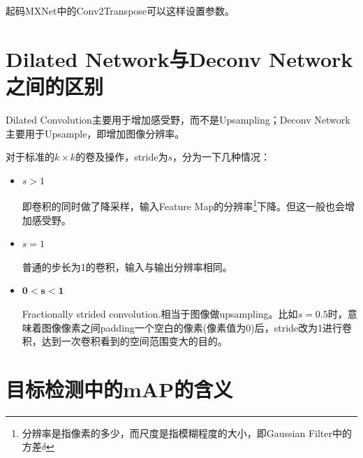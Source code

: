 起码MXNet中的Conv2Transpose可以这样设置参数。




\section{Dilated Network与Deconv Network之间的区别}
Dilated Convolution主要用于增加感受野，而不是Upsampling；Deconv Network主要用于Upsample，即增加图像分辨率。

对于标准的$k \times k$的卷及操作，stride为$s$，分为一下几种情况：
\begin{itemize}
\item $s > 1$

即卷积的同时做了降采样，输入Feature Map的分辨率\footnote{分辨率是指像素的多少，而尺度是指模糊程度的大小，即Gaussian Filter中的方差$\delta$}下降。但这一般也会增加感受野。

\item $s = 1$

普通的步长为1的卷积，输入与输出分辨率相同。

\item $\mathbf{0 < s < 1}$

Fractionally strided convolution.相当于图像做upsampling。比如$s=0.5$时，意味着图像像素之间padding一个空白的像素(像素值为0)后，stride改为1进行卷积，达到一次卷积看到的空间范围变大的目的。

\end{itemize}

\section{目标检测中的mAP的含义}

